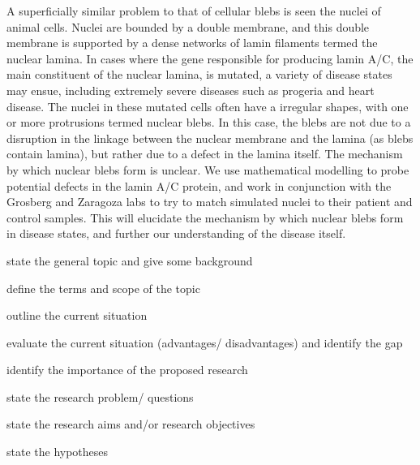 A superficially similar problem to that of cellular blebs is seen the nuclei of animal cells. Nuclei are bounded by a double membrane, and this double membrane is supported by a dense networks of lamin filaments termed the nuclear lamina. In cases where the gene responsible for producing lamin A/C, the main constituent of the nuclear lamina, is mutated, a  variety of disease states may ensue, including extremely severe diseases such as progeria and heart disease. The nuclei in these mutated cells often have a irregular shapes, with one or more protrusions termed nuclear blebs. In this case, the blebs are not due to a disruption in the linkage between the nuclear membrane and the lamina  (as blebs contain lamina), but rather due to a defect in the lamina itself. The mechanism by which nuclear blebs form is unclear. We use mathematical modelling to probe potential defects in the lamin A/C protein, and work in conjunction with the Grosberg and Zaragoza labs to try to match simulated nuclei to their patient and control samples. This will elucidate the mechanism by which nuclear blebs form in disease states, and further our understanding of the disease itself. 






    state the general topic and give some background
    
    define the terms and scope of the topic
    
    outline the current situation
    
    evaluate the current situation (advantages/ disadvantages) and identify the gap
    
    identify the importance of the proposed research
    
    state the research problem/ questions
    
    state the research aims and/or research objectives
    
    state the hypotheses
